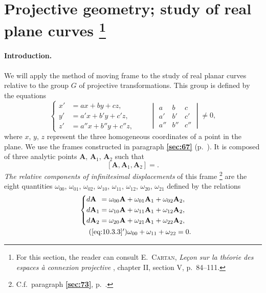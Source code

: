 \documentclass[leqno,11pt]{book}
\numberwithin{equation}{chapter}
\theoremstyle{shape1}
\theoremstyle{shapesmall}
\newcommand{\fsref}[1]{{\rm\textsection\textbf{\ref{sec:#1}}}}
\begin{document}
\section[{Projective geometry; study of real plane curves}]{Projective geometry; study of real plane curves \footnote{For this section, the reader can consult \textsc{E.~Cartan}, \emph{Leçon sur la théorie des espaces à connexion projective} \cite{20}, chapter II, section V, p.~84--111.}}
\label{sec:proj-geom-study}

\paragraph{Introduction.}
\label{sec:141}
We will apply the method of moving frame to the study of real planar curves relative to the group $G$ of projective transformations. This group is defined by the equations
\setcounter{equation}{0}
\begin{equation}
  \label{eq:10.3.1}
  \left\{
    \begin{aligned}
      x'&=ax+by+cz,\\
      y'&=a'x+b'y+c'z,\\
      z'&=a''x+b''y+c''z,
    \end{aligned}
  \right.
  \qquad
  \begin{vmatrix}
    a&b&c\\
    a'&b'&c'\\
    a''&b''&c''
  \end{vmatrix}
  \neq 0,
\end{equation}
where $x$, $y$, $z$ represent the three homogeneous coordinates of a point in the plane. We use the frames constructed in paragraph \fsref{67} (p.~\pageref{sec:67}). It is composed of three analytic points $\mathbf{A}$, $\mathbf{A}_{1}$, $\mathbf{A}_{2}$ such that
\begin{equation}
  \label{eq:10.3.2}
  [\mathbf{A},\mathbf{A}_{1},\mathbf{A}_{2}]=.
\end{equation}
\emph{The relative components of infinitesimal displacements} of this frame \footnote{C.f.~paragraph \fsref{73}, p.~\pageref{sec:73}.} are the eight quantities $\omega_{00}$, $\omega_{01}$, $\omega_{02}$, $\omega_{10}$, $\omega_{11}$, $\omega_{12}$, $\omega_{20}$, $\omega_{21}$ defined by the relations
\begin{gather}
  \label{eq:10.3.3}
  \left\{
    \begin{aligned}
      d\mathbf{A}_{\phantom{0}}&=\omega_{00}\mathbf{A}+\omega_{01}\mathbf{A}_{1}+\omega_{02}\mathbf{A}_{2},\\
      d\mathbf{A}_{1}&=\omega_{10}\mathbf{A}+\omega_{11}\mathbf{A}_{1}+\omega_{12}\mathbf{A}_{2},\\
      d\mathbf{A}_{2}&=\omega_{20}\mathbf{A}+\omega_{21}\mathbf{A}_{1}+\omega_{22}\mathbf{A}_{2},
    \end{aligned}
  \right.
  \\
  \label{eq:10.3.3'}\tag{\ref{eq:10.3.3}$'$}
  \omega_{00}+\omega_{11}+\omega_{22}=0.
\end{gather}
\end{document}
